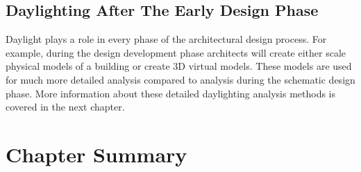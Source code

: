 
  \subsection{Daylighting After The Early Design Phase}
  Daylight plays a role in every phase of the architectural design process.
  For example, during the design development phase architects will create either scale physical models of a building or create 3D virtual models.
  These models are used for much more detailed analysis compared to analysis during the schematic design phase.
  More information about these detailed daylighting analysis methods is covered in the next chapter.


\section{Chapter Summary}

